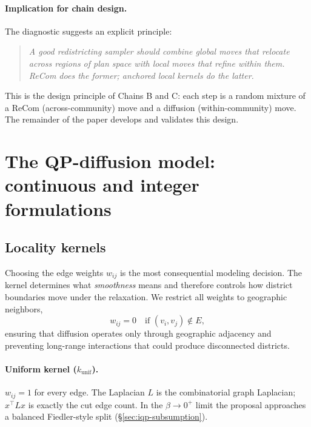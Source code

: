\documentclass[11pt]{article}
\begin{document}
\paragraph{Implication for chain design.}\label{sec:fiber-implication}

The diagnostic suggests an explicit principle:

\begin{quote}
\itshape A good redistricting sampler should combine global moves
that relocate across regions of plan space with local moves that
refine within them. ReCom does the former; anchored local kernels do
the latter.
\end{quote}

This is the design principle of Chains B and C: each step is a random
mixture of a ReCom (across-community) move and a diffusion (within-community)
move. The remainder of the paper develops and validates this design.

\section{The QP-diffusion model: continuous and integer formulations}\label{sec:model}

\subsection{Locality kernels}\label{sec:kernels}

Choosing the edge weights $w_{ij}$ is the most consequential modeling
decision. The kernel determines what \emph{smoothness} means and
therefore controls how district boundaries move under the relaxation.
We restrict all weights to geographic neighbors,
\begin{equation}\label{eq:kernel-local}
  w_{ij} = 0 \quad \text{if } (v_i, v_j) \notin E,
\end{equation}
ensuring that diffusion operates only through geographic adjacency and
preventing long-range interactions that could produce disconnected
districts.

\paragraph{Uniform kernel ($k_{\mathrm{unif}}$).} $w_{ij} = 1$ for
every edge. The Laplacian $L$ is the combinatorial graph Laplacian;
$x^\top L x$ is exactly the cut edge count. In the $\beta \to 0^+$
limit the proposal approaches a balanced Fiedler-style split
(\S\ref{sec:iqp-subsumption}).
\end{document}
